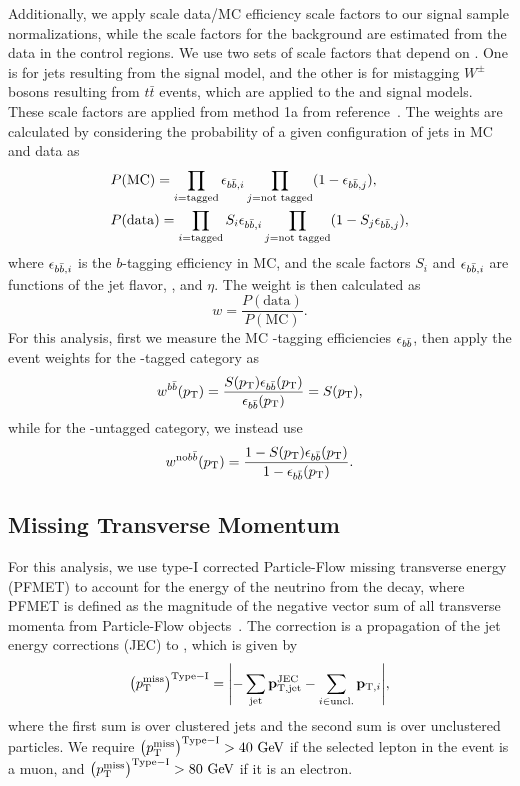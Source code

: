 Additionally, we apply scale data/MC efficiency scale factors to our signal sample normalizations, while the scale factors for the background are estimated from the data in the control regions.
We use two sets of scale factors that depend on \ptjet.
One is for \Htobbbar jets resulting from the \WprtoWHtolnubbbar signal model, and the other is for mistagging $W^\pm$ bosons resulting from $t\bar{t}$ events, which are applied to the \GBulktoWWtolnuqqbarpr and \WprtoWZtolnuqqbar signal models.
These scale factors are applied from method 1a from reference~\cite{bTaggingEff}.
The weights are calculated by considering the probability of a given configuration of jets in MC and data as
\begin{align}
  & P(\mathrm{MC})=\prod_{i=\text{tagged}}\epsilon_{b\bar{b},i}\prod_{j=\text{not tagged}}(1-\epsilon_{b\bar{b},j}),\\
  & P(\mathrm{data})=\prod_{i=\text{tagged}}S_i\epsilon_{b\bar{b},i}\prod_{j=\text{not tagged}}(1-S_j\epsilon_{b\bar{b},j}),
\end{align}
where $\epsilon_{b\bar{b},i}$ is the $b$-tagging efficiency in MC, and the scale factors $S_i$ and $\epsilon_{b\bar{b},i}$ are functions of the jet flavor, \pt, and $\eta$.
The weight is then calculated as
\begin{equation}
  w=\frac{P(\mathrm{data})}{P(\mathrm{MC})}.
\end{equation}
For this analysis, first we measure the MC \bbbar-tagging efficiencies $\epsilon_{b\bar{b}}$, then apply the event weights for the \bbbar-tagged category as
\begin{equation}
  w^{b\bar{b}}(p_\mathrm{T})=\frac{S(p_\mathrm{T})\epsilon_{b\bar{b}}(p_\mathrm{T})}{\epsilon_{b\bar{b}}(p_\mathrm{T})}=S(p_\mathrm{T}),
\end{equation}
while for the \bbbar-untagged category, we instead use
\begin{equation}
  w^{\mathrm{no}b\bar{b}}(p_\mathrm{T})=\frac{1-S(p_\mathrm{T})\epsilon_{b\bar{b}}(p_\mathrm{T})}{1-\epsilon_{b\bar{b}}(p_\mathrm{T})}.
\end{equation}

\subsection{Missing Transverse Momentum}

For this analysis, we use type-I corrected Particle-Flow missing transverse energy (PFMET) to account for the energy of the neutrino from the \Wlep decay, where PFMET is defined as the magnitude of the negative vector sum of all transverse momenta from Particle-Flow objects~\cite{Sirunyan:2019kia}.
The correction is a propagation of the jet energy corrections (JEC) to \ptmiss, which is given by
\begin{equation}
  \ptmissTI=\vqty{-\sum_\mathrm{jet}\vb{p}_\mathrm{T,jet}^\mathrm{JEC}-\sum_{i\in\mathrm{uncl.}}\vb{p}_{\mathrm{T},i}},
\end{equation}
where the first sum is over clustered jets and the second sum is over unclustered particles.
We require $\ptmissTI>40\unit{GeV}$ if the selected lepton in the event is a muon, and $\ptmissTI>80\unit{GeV}$ if it is an electron.

